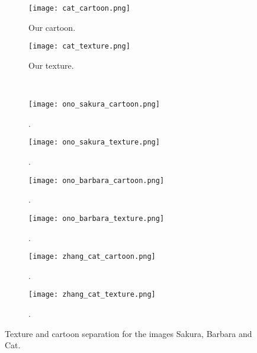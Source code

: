 \documentclass[10pt,twocolumn,letterpaper]{article}
\begin{document}
\begin{figure*}[b!]
	\begin{subfigure}{0.12\textwidth}
		\centering
		\texttt{[image: cat\_cartoon.png]}
		\caption{Our cartoon.}
	\end{subfigure}
	\begin{subfigure}{0.12\textwidth}
		\centering
		\texttt{[image: cat\_texture.png]}
		\caption{Our texture.}
	\end{subfigure}
	\\[0.1cm]
	\begin{subfigure}{0.12\textwidth}
		\centering
		\texttt{[image: ono\_sakura\_cartoon.png]}
		\caption{\cite{ono2014cartoon}.}
	\end{subfigure}
	\begin{subfigure}{0.12\textwidth}
		\centering
		\texttt{[image: ono\_sakura\_texture.png]}
		\caption{\cite{ono2014cartoon}.}
	\end{subfigure}
	\hspace{0.5cm}
	\begin{subfigure}{0.12\textwidth}
		\centering
		\texttt{[image: ono\_barbara\_cartoon.png]}
		\caption{\cite{ono2014cartoon}.}
	\end{subfigure}
	\begin{subfigure}{0.12\textwidth}
		\centering
		\texttt{[image: ono\_barbara\_texture.png]}
		\caption{\cite{ono2014cartoon}.}
	\end{subfigure}
	\hspace{0.5cm}
	\begin{subfigure}{0.12\textwidth}
		\centering
		\texttt{[image: zhang\_cat\_cartoon.png]}
		\caption{\cite{zhangconvolutional}.}
	\end{subfigure}
	\begin{subfigure}{0.12\textwidth}
		\centering
		\texttt{[image: zhang\_cat\_texture.png]}
		\caption{\cite{zhangconvolutional}.}
	\end{subfigure}
	\caption{Texture and cartoon separation for the images \textsf{\small{Sakura}}, \textsf{\small{Barbara}} and \textsf{\small{Cat}}.}
	\label{Fig:separation}
\end{figure*}
\end{document}
